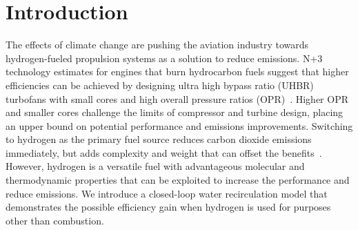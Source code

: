 \documentclass[conf]{new-aiaa}
\begin{document}
\section{Introduction}
The effects of climate change are pushing the aviation industry towards hydrogen-fueled propulsion systems as a solution to reduce emissions.
N+3 technology estimates for engines that burn hydrocarbon fuels suggest that higher efficiencies can be achieved by designing ultra high bypass ratio (UHBR) turbofans with small cores and high overall pressure ratios (OPR)~\cite{Jones2017a}.
Higher OPR and smaller cores challenge the limits of compressor and turbine design, placing an upper bound on potential performance and emissions improvements.
Switching to hydrogen as the primary fuel source reduces carbon dioxide emissions immediately, but adds complexity and weight that can offset the benefits~\cite{Adler2023}.
However, hydrogen is a versatile fuel with advantageous molecular and thermodynamic properties that can be exploited to increase the performance and reduce emissions.
We introduce a closed-loop water recirculation model that demonstrates the possible efficiency gain when hydrogen is used for purposes other than combustion.
\end{document}
